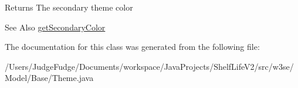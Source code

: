 \begin{DoxyReturn}{Returns}
The secondary theme color 
\end{DoxyReturn}
\begin{DoxySeeAlso}{See Also}
\hyperlink{classw3se_1_1_model_1_1_base_1_1_theme_aace89df49ffc8cc75fb227084d552150}{get\-Secondary\-Color} 
\end{DoxySeeAlso}


The documentation for this class was generated from the following file\-:\begin{DoxyCompactItemize}
\item 
/\-Users/\-Judge\-Fudge/\-Documents/workspace/\-Java\-Projects/\-Shelf\-Life\-V2/src/w3se/\-Model/\-Base/Theme.\-java\end{DoxyCompactItemize}
